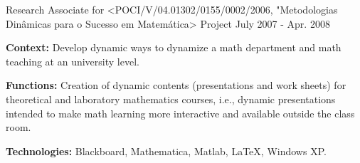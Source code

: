 \begin{cventries}
  \cventry    
    {Research Associate for <POCI/V/04.01302/0155/0002/2006, "Metodologias Din\^amicas para o Sucesso em Matem\'atica> Project} %
    {} %
    {} %
    {July 2007 - Apr. 2008} %
    {
      \begin{cvitems} %
		\item[] {\textbf{Context:} Develop dynamic ways to dynamize a math department and math teaching at an university level.}
		\item[] {\textbf{Functions:} Creation of dynamic contents (presentations and work sheets) for theoretical and laboratory mathematics courses, i.e., dynamic presentations intended to make math learning more interactive and available outside the class room.}
  		\item[] {\textbf{Technologies:} \textcolor{rainbowcolor-olive}{Blackboard}, \textcolor{rainbowcolor-olive}{Mathematica}, \textcolor{rainbowcolor-olive}{Matlab}, \textcolor{rainbowcolor-olive}{LaTeX}, %
  		\textcolor{rainbowcolor-orange}{Windows XP}.}
      \end{cvitems}
    }  
     
\end{cventries}

\vspace{5.0cm}
